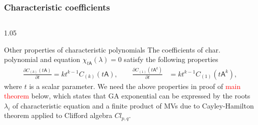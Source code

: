 \documentclass[xcolor=table,hyperref={pdfpagemode=FullScreen}]{beamer}
\newcommand{\cl}[2]{\ensuremath{\mathit{Cl}_{#1,#2}}} %
\def\m#1{\mathsf{#1}} %
\def\m#1{\mathsf{#1}}%
\newcommand{\red}[1]{\textcolor{red}{#1}}
\begin{document}
\begin{frame}
\frametitle<presentation>{Characteristic coefficients}
\vskip -16pt
\begin{columns}[t]
\begin{column}{1.05\textwidth}
  \begin{block}{Other properties of characteristic polynomials}
The coefficients of char. polynomial and  equation  $\chi_{t\m{A}}(\lambda)=0$ satisfy the following
properties
\begin{align}\label{propertyDC}
  \frac{\partial C_{(k)}(t \m{A})}{\partial t}=k t^{k-1}  C_{(k)}(t \m{A}),\qquad
  \frac{\partial C_{(1)}(t \m{A}^k)}{\partial t}&=k t^{k-1}  C_{(1)}(t \m{A}^k),
\end{align}
where $t$ is a scalar parameter. We  need
the above properties in  proof of \red{main theorem} below,  which   states that  GA exponential
can be expressed by the  roots $\lambda_i$ of characteristic equation and a finite product of MVs due to Cayley-Hamilton theorem
applied to Clifford algebra \cl{p}{q}.
\end{block}
\end{column}
\end{columns}
\end{frame}


\end{document}

